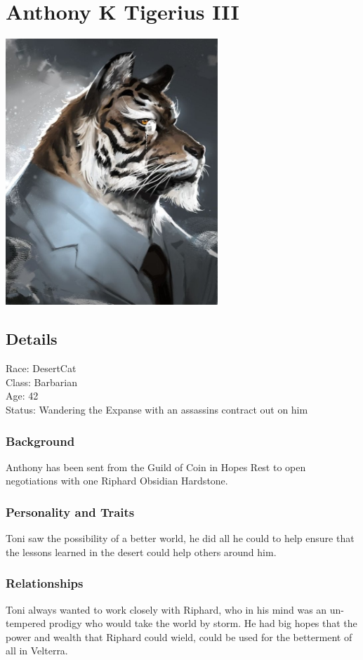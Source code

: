 \section{Anthony K Tigerius III}

\begin{center}
\includegraphics[width=80mm]{./content/img/toniTiger.jpg}
\begin{figure}[h]
\end{figure}
\end{center}

\subsection*{Details}

Race: DesertCat\\
Class: Barbarian\\
Age: 42\\
Status: Wandering the Expanse with an assassins contract out on him

\subsubsection{Background}

Anthony has been sent from the Guild of Coin in Hopes Rest to open negotiations with one Riphard Obsidian Hardstone.

\subsubsection{Personality and Traits}

Toni saw the possibility of a better world, he did all he could to help ensure that the lessons learned in the desert could help others around him.

\subsubsection{Relationships}

Toni always wanted to work closely with Riphard, who in his mind was an un-tempered prodigy who would take the world by storm. He had big hopes that the power and wealth that Riphard could wield, could be used for the betterment of all in Velterra.\bigskip

\clearpage